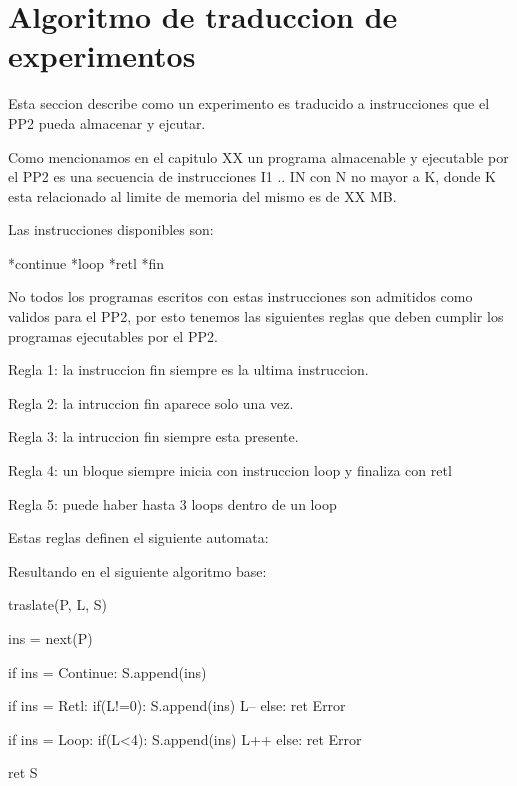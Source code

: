 \section{Algoritmo de traduccion de experimentos}

Esta seccion describe como un experimento es traducido a instrucciones que el PP2 pueda almacenar y ejcutar.

Como mencionamos en el capitulo XX un programa almacenable y ejecutable por el PP2 es una secuencia de 
instrucciones I1 .. IN con N no mayor a K, donde K esta relacionado al limite de memoria del mismo es de XX MB.

Las instrucciones disponibles son:

*continue
*loop
*retl
*fin

No todos los programas escritos con estas instrucciones son admitidos como validos para el PP2, 
por esto tenemos las siguientes reglas que deben cumplir los programas ejecutables por el PP2.

Regla 1:
la instruccion fin siempre es la ultima instruccion.

Regla 2:
la intruccion fin aparece solo una vez.

Regla 3:
la intruccion fin siempre esta presente.

Regla 4:
un bloque siempre inicia con instruccion loop y finaliza con retl

Regla 5:
puede haber hasta 3 loops dentro de un loop

Estas reglas definen el siguiente automata:



Resultando en el siguiente algoritmo base: 


traslate(P, L, S)

    ins = next(P)

    if ins = Continue:
        S.append(ins)

    if ins = Retl:
        if(L!=0):
            S.append(ins)
            L--
        else:
            ret Error

    if ins = Loop:
        if(L<4):
            S.append(ins)
            L++
        else:
            ret Error
    
    ret S